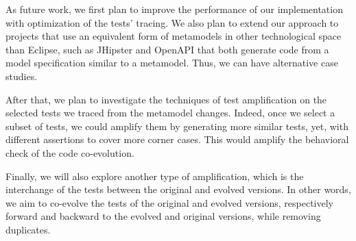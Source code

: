 As future work, we first plan to improve the performance of our implementation with optimization of the tests' tracing.  %
We also plan to extend our approach to projects that use an equivalent form of metamodels in other technological space than Eclipse, such as JHipster and OpenAPI that both generate code from a model specification similar to a metamodel. Thus, we can have alternative case studies. 

After that, we plan to investigate the techniques of test amplification on the selected tests we traced from the metamodel changes. Indeed, once we select a subset of tests, we could amplify them by generating more similar tests, yet, with different assertions to cover more corner cases. This would amplify the behavioral check of the code co-evolution. 

Finally, we will also explore another type of amplification, which is the interchange of the tests between the original and evolved versions. In other words, we aim to co-evolve the tests of the original and evolved versions, respectively forward and backward to the evolved and original versions, while removing duplicates. 




